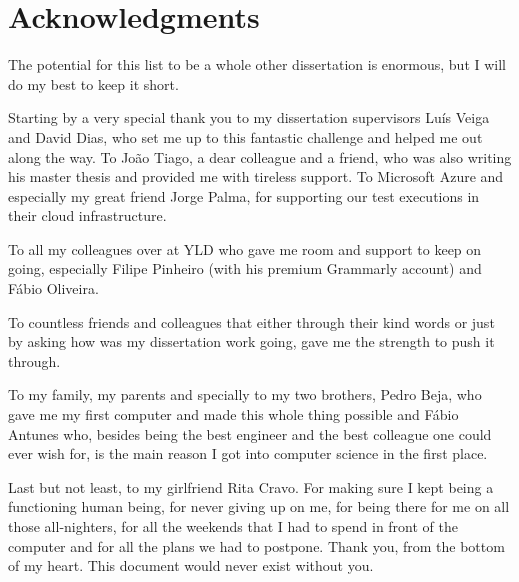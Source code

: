 
\chapter*{Acknowledgments}

The potential for this list to be a whole other dissertation is enormous, but I
will do my best to keep it short.

Starting by a very special thank you to my dissertation supervisors Luís Veiga
and David Dias, who set me up to this fantastic challenge and helped me out
along the way. To João Tiago, a dear colleague and a friend, who was also
writing his master thesis and provided me with tireless support. To Microsoft
Azure and especially my great friend Jorge Palma, for supporting our test
executions in their cloud infrastructure.

To all my colleagues over at YLD who gave me room and support to keep on going,
especially Filipe Pinheiro (with his premium Grammarly account) and Fábio
Oliveira.

To countless friends and colleagues that either through their kind words or
just by asking how was my dissertation work going, gave me the strength to push
it through.

To my family, my parents and specially to my two brothers, Pedro Beja, who gave
me my first computer and made this whole thing possible and Fábio Antunes who,
besides being the best engineer and the best colleague one could ever wish for,
is the main reason I got into computer science in the first place.

Last but not least, to my girlfriend Rita Cravo. For making sure I kept being a
functioning human being, for never giving up on me, for being there for me on
all those all-nighters, for all the weekends that I had to spend in front of
the computer and for all the plans we had to postpone. Thank you, from the
bottom of my heart. This document would never exist without you.


